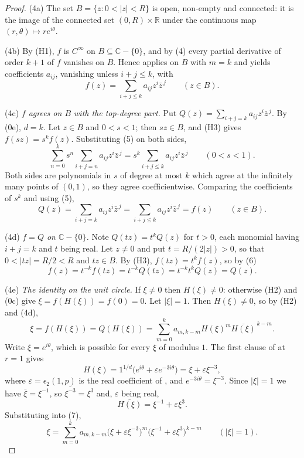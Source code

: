 \begin{proof}
\noindent(4a) The set $B=\{z:0<|z|<R\}$ is open, non-empty and connected: it is
the image of the connected set $(0,R)\times\mathbb{R}$ under the continuous map
$(r,\theta)\mapsto re^{i\theta}$.

\noindent(4b) By (H1), $f$ is $C^\infty$ on $B\subseteq\mathbb{C}-\{0\}$, and by
(4) every partial derivative of order $k+1$ of $f$ vanishes on $B$.  Hence
 applies on $B$ with $m=k$ and yields
coefficients $a_{ij}$, vanishing unless $i+j\le k$, with
\begin{equation}\tag{5}
  f(z)=\sum_{i+j\le k}a_{ij}z^i\bar z^{\,j}\qquad(z\in B).
\end{equation}

\noindent(4c) \emph{$f$ agrees on $B$ with the top-degree part.}  Put
$Q(z)=\sum_{i+j=k}a_{ij}z^i\bar z^{\,j}$.  By (0e), $d=k$.  Let $z\in B$ and
$0<s<1$; then $sz\in B$, and (H3) gives $f(sz)=s^{k}f(z)$.  Substituting (5) on
both sides,
\[
  \sum_{n=0}^{k}s^{n}\sum_{i+j=n}a_{ij}z^i\bar z^{\,j}
  =s^{k}\sum_{i+j\le k}a_{ij}z^i\bar z^{\,j}
  \qquad(0<s<1).
\]
Both sides are polynomials in $s$ of degree at most $k$ which agree at the
infinitely many points of $(0,1)$, so they agree coefficientwise.  Comparing
the coefficients of $s^{k}$ and using (5),
\begin{equation}\tag{6}
  Q(z)=\sum_{i+j=k}a_{ij}z^i\bar z^{\,j}
  =\sum_{i+j\le k}a_{ij}z^i\bar z^{\,j}=f(z)\qquad(z\in B).
\end{equation}

\noindent(4d) \emph{$f=Q$ on $\mathbb{C}-\{0\}$.}  Note $Q(tz)=t^{k}Q(z)$ for
$t>0$, each monomial having $i+j=k$ and $t$ being real.  Let $z\neq0$ and put
$t=R/(2|z|)>0$, so that $0<|tz|=R/2<R$ and $tz\in B$.  By (H3),
$f(tz)=t^{k}f(z)$, so by (6)
\[
  f(z)=t^{-k}f(tz)=t^{-k}Q(tz)=t^{-k}t^{k}Q(z)=Q(z).
\]

\noindent(4e) \emph{The identity on the unit circle.}  If $\xi\neq0$ then
$H(\xi)\neq0$: otherwise (H2) and (0c) give $\xi=f(H(\xi))=f(0)=0$.  Let
$|\xi|=1$.  Then $H(\xi)\neq0$, so by (H2) and (4d),
\begin{equation}\tag{7}
  \xi=f(H(\xi))=Q(H(\xi))
  =\sum_{m=0}^{k}a_{m,k-m}H(\xi)^{m}\overline{H(\xi)}^{\,k-m}.
\end{equation}
Write $\xi=e^{i\theta}$, which is possible for every $\xi$ of modulus $1$.  The
first clause of  at $r=1$ gives
\[
  H(\xi)=1^{1/d}\bigl(e^{i\theta}+\varepsilon e^{-3i\theta}\bigr)
  =\xi+\varepsilon\xi^{-3},
\]
where $\varepsilon=\epsilon_2(1,p)$ is the real coefficient of
, and $e^{-3i\theta}=\xi^{-3}$.  Since $|\xi|=1$ we have
$\bar\xi=\xi^{-1}$, so $\overline{\xi^{-3}}=\xi^{3}$ and, $\varepsilon$ being
real,
\[
  \overline{H(\xi)}=\xi^{-1}+\varepsilon\xi^{3}.
\]
Substituting into (7),
\begin{equation}\tag{8}
  \xi=\sum_{m=0}^{k}a_{m,k-m}
    \bigl(\xi+\varepsilon\xi^{-3}\bigr)^{m}
    \bigl(\xi^{-1}+\varepsilon\xi^{3}\bigr)^{k-m}
  \qquad(|\xi|=1).
\end{equation}


\end{proof}
